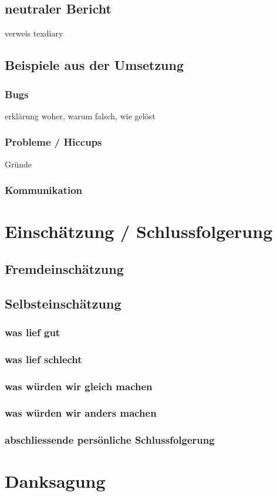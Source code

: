 \documentclass[a4paper,11pt]{article}
\begin{document}
\subsection{neutraler Bericht}
verweis texdiary
\subsection{Beispiele aus der Umsetzung}
\subsubsection{Bugs}
erklärung woher, warum falsch, wie gelöst

\subsubsection{Probleme / Hiccups}
Gründe

\subsubsection{Kommunikation}

\section{Einschätzung / Schlussfolgerung}

\subsection{Fremdeinschätzung}
\subsection{Selbsteinschätzung}
\subsubsection{was lief gut}
\subsubsection{was lief schlecht}
\subsubsection{was würden wir gleich machen}
\subsubsection{was würden wir anders machen}
\subsubsection{abschliessende persönliche Schlussfolgerung}

\section{Danksagung}
\end{document}
